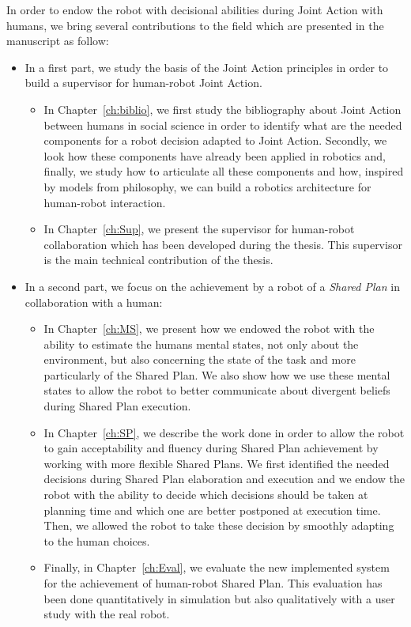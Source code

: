 \documentclass[english,a4paper,11pt,twoside]{StyleThese}
\begin{document}
In order to endow the robot with decisional abilities during Joint Action with humans, we bring several contributions to the field which are presented in the manuscript as follow:
\begin{itemize}
\item In a first part, we study the basis of the Joint Action principles in order to build a supervisor for human-robot Joint Action. 
\begin{itemize}
\item In Chapter~\ref{ch:biblio}, we first study the bibliography about Joint Action between humans in social science in order to identify what are the needed components for a robot decision adapted to Joint Action. Secondly, we look how these components have already been applied in robotics and, finally, we study how to articulate all these components and how, inspired by models from philosophy, we can build a robotics architecture for human-robot interaction.
\item In Chapter~\ref{ch:Sup}, we present the supervisor for human-robot collaboration which has been developed during the thesis. This supervisor is the main technical contribution of the thesis.
\end{itemize}
\item In a second part, we focus on the achievement by a robot of a \textit{Shared Plan} in collaboration with a human:
\begin{itemize}
\item In Chapter~\ref{ch:MS}, we present how we endowed the robot with the ability to estimate the humans mental states, not only about the environment, but also concerning the state of the task and more particularly of the Shared Plan. We also show how we use these mental states to allow the robot to better communicate about divergent beliefs during Shared Plan execution.
\item In Chapter~\ref{ch:SP}, we describe the work done in order to allow the robot to gain acceptability and fluency during Shared Plan achievement by working with more flexible Shared Plans. We first identified the needed decisions during Shared Plan elaboration and execution and we endow the robot with the ability to decide which decisions should be taken at planning time and which one are better postponed at execution time. Then, we allowed the robot to take these decision by smoothly adapting to the human choices.
\item Finally, in Chapter~\ref{ch:Eval}, we evaluate the new implemented system for the achievement of human-robot Shared Plan. This evaluation has been done quantitatively in simulation but also qualitatively with a user study with the real robot.

\end{itemize}
\end{itemize}
\end{document}
